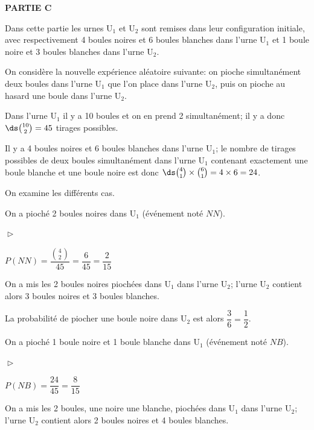 \bigskip

\textbf{PARTIE C}

\medskip

Dans cette partie les urnes U$_1$ et U$_2$ sont remises dans leur configuration initiale, avec respectivement 4 boules noires et 6 boules blanches dans l'urne U$_1$ et 1 boule noire et 3 boules blanches dans l'urne U$_2$.

\smallskip

On considère la nouvelle expérience aléatoire suivante: on pioche simultanément deux boules dans l'urne U$_1$ que l'on place dans l'urne U$_2$, puis on pioche au hasard une boule dans l'urne U$_2$.

\medskip

\begin{enumerate}
\item
Dans l'urne U$_1$ il y a 10 boules et on en prend 2 simultanément; il y a donc $\ds\binom{10}{2}=45$ tirages possibles.

\item
Il y a 4 boules noires et 6 boules blanches dans l'urne U$_1$; le nombre de tirages possibles de deux boules simultanément dans l'urne U$_1$ contenant exactement une boule blanche et une boule noire est donc $\ds\binom{4}{1}\times \binom{6}{1} = 4\times 6 = 24$.

\item 
\begin{list}{\textbullet}{On examine les différents cas.}
\item On a pioché 2 boules noires dans U$_1$ (événement noté $NN$).

\begin{list}{$\vartriangleright$}{}
\item $P\left (NN\right ) = \dfrac{\binom{4}{2}}{45} = \dfrac{6}{45}=\dfrac{2}{15}$
\item On a mis les 2 boules noires piochées dans U$_1$ dans l'urne U$_2$; l'urne U$_2$ contient alors 3 boules noires et 3 boules blanches. 

La probabilité de piocher une boule noire dans U$_2$ est alors $\dfrac{3}{6}=\dfrac{1}{2}$.
\end{list}

\item On a pioché 1 boule noire et 1 boule blanche dans U$_1$ (événement noté $NB$).

\begin{list}{$\vartriangleright$}{}
\item $P\left (NB\right ) = \dfrac{24}{45} =\dfrac{8}{15}$
\item On a mis les 2 boules,  une noire une blanche, piochées dans U$_1$ dans l'urne U$_2$; l'urne U$_2$ contient alors 2 boules noires et 4 boules blanches. 


\end{list}
\end{list}
\end{enumerate}
